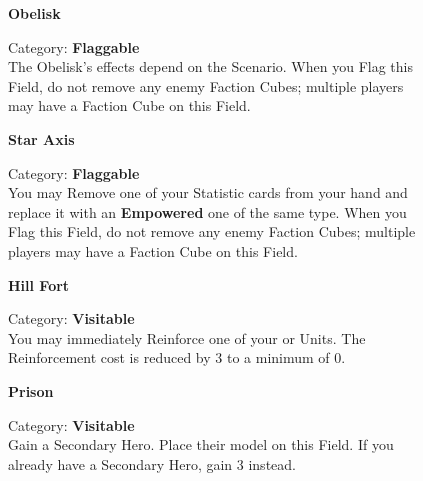 \begin{figure}[H]
  \begin{minipage}[t]{0.47\textwidth}
    \vspace{0pt}
    \centering
    \phantom{j}\textbf{Obelisk}\par
    \caption{\small Category: \textbf{Flaggable}\\
      The Obelisk's effects depend on the Scenario.
      When you Flag this Field, do not remove any enemy Faction Cubes; multiple players may have a Faction Cube on this Field.}
  \end{minipage}\hfill
  \begin{minipage}[t]{0.47\textwidth}
    \vspace{0pt}
    \centering
    \phantom{j}\textbf{Star Axis}\par
    \caption{\small Category: \textbf{Flaggable}\\
      You may Remove one of your Statistic cards from your hand and replace it with an \textbf{Empowered} one of the same type.
      When you Flag this Field, do not remove any enemy Faction Cubes; multiple players may have a Faction Cube on this Field.}
  \end{minipage}
\end{figure}

\begin{figure}[H]
  \begin{minipage}[t]{0.47\textwidth}
    \vspace{0pt}
    \centering
    \phantom{j}\textbf{Hill Fort}\par
    \caption{\small Category: \textbf{Visitable}\\
      You may immediately Reinforce one of your  or  Units.
      The Reinforcement cost is reduced by 3  to a minimum of 0.}
  \end{minipage}\hfill
  \begin{minipage}[t]{0.47\textwidth}
    \vspace{0pt}
    \centering
    \phantom{j}\textbf{Prison}\par
    \caption{\small Category: \textbf{Visitable}\\
      Gain a Secondary Hero.
      Place their model on this Field.
      If you already have a Secondary Hero, gain 3  instead.}
  \end{minipage}
\end{figure}

